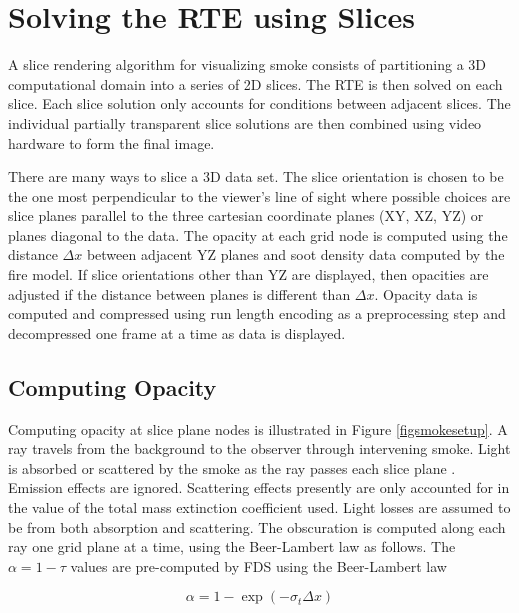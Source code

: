 %
%

\section{Solving the RTE using Slices}
A slice rendering algorithm for visualizing smoke consists of partitioning a 3D computational domain into a series of 2D slices.  The RTE is then solved on each slice.  Each slice solution only accounts for conditions between adjacent slices.  The individual partially transparent slice solutions are then combined using video hardware to form the final image.

There are many ways to slice a 3D data set.  The slice orientation is chosen to be the one most perpendicular to the viewer's line of sight where possible choices are slice planes parallel to the three cartesian coordinate planes (XY, XZ, YZ) or planes diagonal to the data.  The opacity at each grid node is computed using the distance $\Delta x$ between adjacent YZ planes and soot density data computed by the fire model.  If slice orientations other than YZ are displayed, then opacities are adjusted if the distance between planes is different than $\Delta x$.  Opacity data is computed and compressed using run length encoding as a preprocessing step and decompressed one frame at a time as data is displayed.


%
%

\subsection{Computing Opacity}
Computing opacity at slice plane nodes is illustrated in Figure \ref{figsmokesetup}. A ray travels from the background to the observer through intervening smoke. Light is absorbed or scattered by the smoke as the ray passes each slice plane .  Emission effects are ignored. Scattering effects presently are only accounted for in the value of the total mass extinction coefficient used.  Light losses are assumed to be from both absorption and scattering. The obscuration is computed along each ray one grid plane at a time, using the Beer-Lambert law as follows.  The $\alpha=1-\tau$ values are pre-computed by FDS using the Beer-Lambert law~\cite{Siegel:2001}

\begin{equation}
\label{eq:alpha}
\alpha=1-\exp(-\sigma_t\Delta x)
\end{equation}

